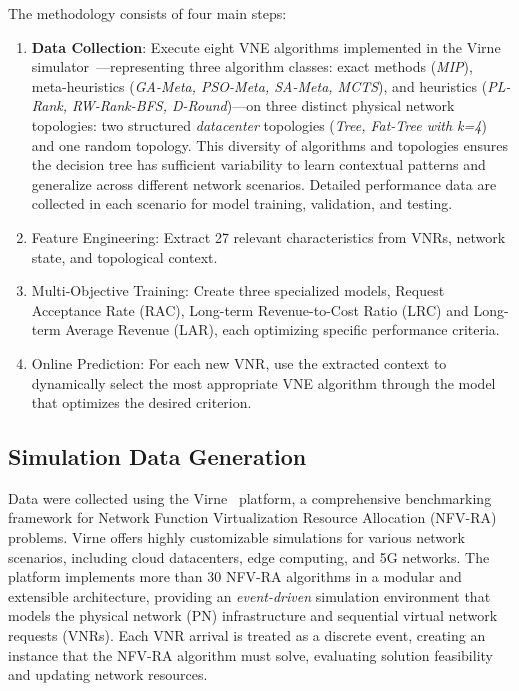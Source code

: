 \documentclass[a4paper,twoside]{article}
\begin{document}
The methodology consists of four main steps:

\begin{enumerate}
        \item \textbf{Data Collection}: Execute eight VNE algorithms implemented in the Virne simulator~\cite{wang2024virne}---representing three algorithm classes: exact methods (\textit{MIP}), meta-heuristics (\textit{GA-Meta, PSO-Meta, SA-Meta, MCTS}), and heuristics (\textit{PL-Rank, RW-Rank-BFS, D-Round})---on three distinct physical network topologies: two structured \textit{datacenter} topologies (\textit{Tree, Fat-Tree with k=4}) and one random topology. This diversity of algorithms and topologies ensures the decision tree has sufficient variability to learn contextual patterns and generalize across different network scenarios. Detailed performance data are collected in each scenario for model training, validation, and testing.
    \item Feature Engineering: Extract 27 relevant characteristics from VNRs, network state, and topological context.
    \item Multi-Objective Training: Create three specialized models, Request Acceptance Rate (RAC), Long-term Revenue-to-Cost Ratio (LRC) and Long-term Average Revenue (LAR), each optimizing specific performance criteria.
    \item Online Prediction: For each new VNR, use the extracted context to dynamically select the most appropriate VNE algorithm through the model that optimizes the desired criterion.
\end{enumerate}

\subsection{Simulation Data Generation}

Data were collected using the Virne~\cite{wang2024virne} platform, a comprehensive benchmarking framework for Network Function Virtualization Resource Allocation (NFV-RA) problems. Virne offers highly customizable simulations for various network scenarios, including cloud datacenters, edge computing, and 5G networks. The platform implements more than 30 NFV-RA algorithms in a modular and extensible architecture, providing an \textit{event-driven} simulation environment that models the physical network (PN) infrastructure and sequential virtual network requests (VNRs). Each VNR arrival is treated as a discrete event, creating an instance that the NFV-RA algorithm must solve, evaluating solution feasibility and updating network resources.
\end{document}
